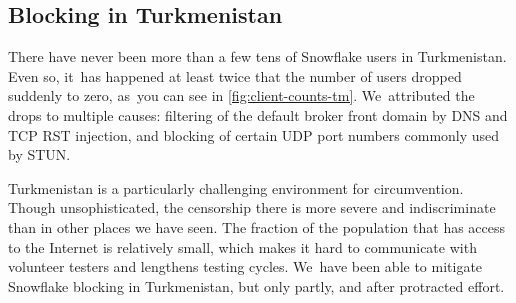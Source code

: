 \documentclass[letterpaper,twocolumn]{article}
\begin{document}
\subsection{Blocking in Turkmenistan}
\label{sec:block-tm}


There have never been more than a few tens of Snowflake users in Turkmenistan.
Even so, it~has happened at least twice
that the number of users dropped suddenly to zero,
as~you can see in \autoref{fig:client-counts-tm}.
We~attributed the drops to multiple causes:
filtering of the default broker front domain
by DNS and TCP RST injection,
and blocking of certain UDP port numbers
commonly used by STUN.

Turkmenistan is a particularly challenging environment for circumvention.
Though unsophisticated, the censorship there
is more severe and indiscriminate
than in other places we have seen.
The fraction of the population that has access to the Internet is relatively small,
which makes it hard to communicate with volunteer testers
and lengthens testing cycles.
We~have been able to mitigate Snowflake blocking in Turkmenistan,
but only partly, and after protracted effort.
\end{document}
